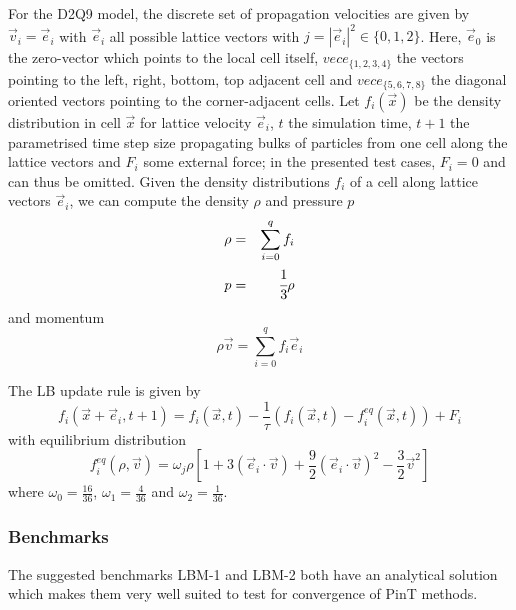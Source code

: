 For the D2Q9 model, the discrete set of propagation velocities are given by $\vec{v}_i = \vec{e}_i$ with $\vec{e}_i$ all possible lattice vectors with $j = |\vec{e}_i|^2 \in \{0,1,2\}$.
Here, $\vec{e}_0$ is the zero-vector which points to the local cell itself, $vec{e}_{\{1,2,3,4\}}$ the vectors pointing to the left, right, bottom, top adjacent cell and $vec{e}_{\{5,6,7,8\}}$ the diagonal oriented vectors pointing to the corner-adjacent cells.
Let $f_i(\vec{x})$ be the density distribution in cell $\vec{x}$ for lattice velocity $\vec{e}_i$, $t$ the simulation time, $t+1$ the parametrised time step size propagating bulks of particles from one cell along the lattice vectors and $F_i$ some external force; in the presented test cases, $F_i=0$ and can thus be omitted.
Given the density distributions $f_i$ of a cell along lattice vectors $\vec{e}_i$, we can compute the density $\rho$ and pressure $p$
\begin{eqnarray}
	\rho &=& \sum_{i=0}^q f_i\\
        p    &=& \cfrac{1}{3} \rho
\end{eqnarray}
and momentum
\begin{equation}
	\rho \vec{v} = \sum_{i=0}^q f_i \vec{e}_i
\end{equation}

The LB update rule is given by
\begin{equation}
	f_i(\vec{x}+\vec{e}_{i}, t+1) = f_i(\vec{x},t) - \frac{1}{\tau}
	\left(
		f_i(\vec{x},t) - f_i^{eq}(\vec{x},t)
	\right)
	+ F_i
\end{equation}
with equilibrium distribution
\begin{equation}
	f_i^{eq}(\rho, \vec{v}) = \omega_j \rho
	\left[
		1 + 3(\vec{e}_i \cdot \vec{v}) + \frac{9}{2} (\vec{e}_i \cdot \vec{v})^2 - \frac{3}{2} \vec{v}^2
	\right]
\end{equation}
where
	$\omega_0 = \frac{16}{36}$,
	$\omega_1 = \frac{4}{36}$ and
	$\omega_2 = \frac{1}{36}$.



\subsubsection{Benchmarks}

The suggested benchmarks LBM-1 and LBM-2 both have an analytical solution which makes them very well suited to test for convergence of PinT methods.



